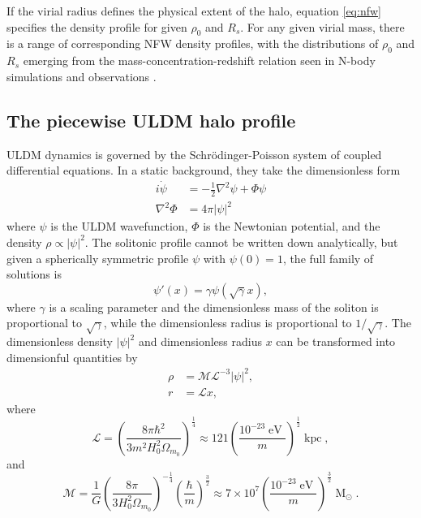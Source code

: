 \documentclass[a4paper,11pt]{article}
\begin{document}
If the virial radius  defines the  physical extent of the halo, equation \ref{eq:nfw}  specifies the density profile for given  $\rho_0$ and $R_s$. For any given virial mass, there is a range of corresponding NFW density profiles, with the distributions of $\rho_0$ and $R_s$ emerging from the mass-concentration-redshift relation seen in N-body simulations and observations \cite{Ludlow:2013vxa, Ragagnin:2018enf}. 

\subsection{The piecewise ULDM halo profile}

ULDM dynamics is governed by the Schr{\"o}dinger-Poisson system of coupled differential equations. In a static background, they take the dimensionless form  
%
\begin{align}
    i\dot{\psi} &= -\frac{1}{2}\nabla^2\psi+\Phi\psi \\
    \nabla^2\Phi &= 4\pi \vert \psi\vert^2
\end{align}
%
where $\psi$ is the ULDM wavefunction, $\Phi$ is the Newtonian potential, and the density $\rho \propto |\psi|^2$. The solitonic profile cannot be written down analytically, but given a spherically symmetric  profile $\psi$ with $\psi(0)=1$, the full family of solutions is
%
\begin{equation}
    \psi'(x) = \gamma\psi(\sqrt{\gamma}x),
\end{equation}
%
where $\gamma$ is a scaling parameter and the dimensionless mass of the soliton is proportional to $\sqrt{\gamma}$, while the dimensionless radius is proportional to $1/\sqrt{\gamma}$. The dimensionless density $\vert\psi\vert^2$ and dimensionless radius $x$ can be transformed into dimensionful quantities by
\begin{align}
    \rho &= \mathcal{M}\mathcal{L}^{-3}\vert\psi\vert^2, \label{eq:density_conv} \\
    r &= \mathcal{L}x, \label{eq:mass_conv}
\end{align}
where
\begin{equation}\label{eq:length}
    \mathcal{L}=\left(\frac{8\pi\hbar^2}{3 m^2H_0^2\Omega_{m_0}}\right)^{\frac{1}{4}}\approx121\left(\frac{10^{-23}\operatorname{eV}}{m}\right)^{\frac{1}{2}}\operatorname{kpc},
\end{equation}
%
and 
%
\begin{equation}\label{eq:mass}
    \mathcal{M}=\frac{1}{G}\left(\frac{8\pi}{3 H_0^2\Omega_{m_0}}\right)^{-\frac{1}{4}}\left(\frac{\hbar}{m}\right)^{\frac{3}{2}}\approx 7\times 10^7\left(\frac{10^{-23}\operatorname{eV}}{m}\right)^{\frac{3}{2}}\operatorname{M}_{\odot}.
\end{equation}
\end{document}
